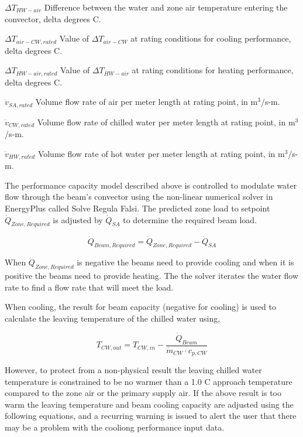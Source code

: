 \({\Delta T_{HW-air}}\) Difference between the water and zone air temperature entering the convector, delta degrees C.

\({\Delta T_{air-CW,rated}}\) Value of \({\Delta T_{air-CW}}\) at rating conditions for cooling performance, delta degrees C.

\({\Delta T_{HW-air,rated}}\) Value of \({\Delta T_{HW-air}}\) at rating conditions for heating performance, delta degrees C.

\({\dot v_{SA,rated}}\) Volume flow rate of air per meter length at rating point, in m\(^{3}\)/s-m.

\({\dot v_{CW,rated}}\) Volume flow rate of chilled water per meter length at rating point, in m\(^{3}\)/s-m.

\({\dot v_{HW,rated}}\) Volume flow rate of hot water per meter length at rating point, in m\(^{3}\)/s-m.

The performance capacity model described above is controlled to modulate water flow through the beam's convector using the non-linear numerical solver in EnergyPlus called Solve Regula Falsi. The predicted zone load to setpoint \({\dot Q_{Zone, Required}}\) is adjusted by \({\dot Q_{SA}}\) to determine the required beam load.

\begin{equation}
{\dot Q_{Beam, Required}} = {\dot Q_{Zone, Required}} - {\dot Q_{SA}}
\end{equation}

When \({\dot Q_{Zone, Required}}\) is negative the beams need to provide cooling and when it is positive the beams need to provide heating. The the solver iterates the water flow rate to find a flow rate that will meet the load.

When cooling, the result for beam capacity (negative for cooling) is used to calculate the leaving temperature of the chilled water using,

\begin{equation}
{T_{CW,out}} = {T_{CW,in}} - \frac{{\dot Q_{Beam}}}{{\dot m_{CW}} \cdot {c_{p,CW}} }
\end{equation}

However, to protect from a non-physical result the leaving chilled water temperature is constrained to be no warmer than a 1.0 C approach temperature compared to the zone air or the primary supply air. If the above result is too warm the leaving temperature and beam cooling capacity are adjusted using the following equations, and a recurring warning is issued to alert the user that there may be a problem with the cooliong performance input data.

